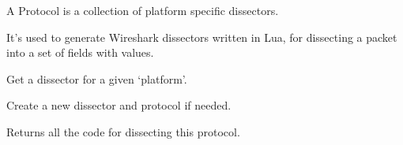 \documentclass[A4paper,10pt,english]{sphinxmanual}
\begin{document}
\begin{fulllineitems}
\label{devel/code:dissector.Protocol}
A Protocol is a collection of platform specific dissectors.

It's used to generate Wireshark dissectors written in Lua, for
dissecting a packet into a set of fields with values.

\begin{fulllineitems}
\label{devel/code:dissector.Protocol.REGISTER_FUNC}
\end{fulllineitems}


\begin{fulllineitems}
\label{devel/code:dissector.Protocol.protocols}
\end{fulllineitems}


\begin{fulllineitems}
\label{devel/code:dissector.Protocol.get_dissector}
Get a dissector for a given `platform'.

\end{fulllineitems}


\begin{fulllineitems}
\label{devel/code:dissector.Protocol.create_dissector}
Create a new dissector and protocol if needed.

\end{fulllineitems}


\begin{fulllineitems}
\label{devel/code:dissector.Protocol.generate}
Returns all the code for dissecting this protocol.


\end{fulllineitems}
\end{fulllineitems}
\end{document}
